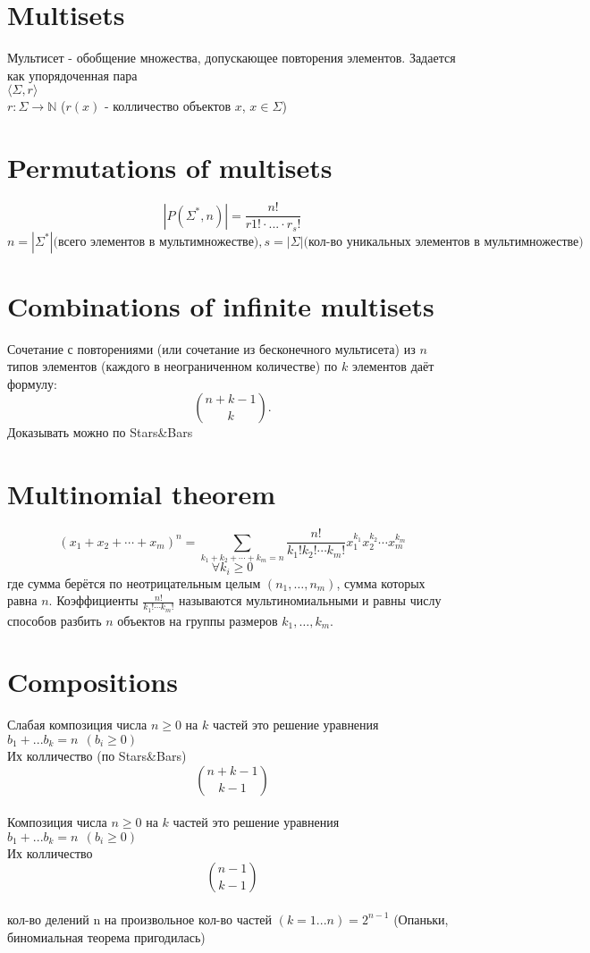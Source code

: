 \documentclass{article}
\begin{document}
	\section{Multisets}
	Мультисет - обобщение множества, допускающее повторения элементов. Задается как упорядоченная пара\\ 
	$\langle \Sigma, r \rangle$\\
	$r \colon \Sigma \rightarrow \mathbb{N}$
	($r(x)$ - колличество объектов $x$, $x \in \Sigma$)
	
	\section{Permutations of multisets}
	\[|P(\Sigma^*, n)| = \frac{n!}{r1! \cdot ... \cdot r_s!}\]
	\[n = |\Sigma^*| \text{(всего элементов в мультимножестве)}, s = |\Sigma| \text{(кол-во уникальных элементов в мультимножестве)}\]
	
	
	\section{Combinations of infinite multisets}
	Сочетание с повторениями (или сочетание из бесконечного мультисета) из $n$ типов элементов (каждого в неограниченном количестве) по $k$ элементов даёт формулу:
	\[
	\binom{n+k-1}{k}.
	\]
	Доказывать можно по Stars\&Bars
	
	\section{Multinomial theorem}
	\[
	(x_1 + x_2 + \cdots + x_m)^n = \sum_{k_1+k_2+\cdots+k_m=n} \frac{n!}{k_1!k_2!\cdots k_m!} x_1^{k_1}x_2^{k_2}\cdots x_m^{k_m}\]
	\[
	\forall k_i \geq 0
	\]
	где сумма берётся по неотрицательным целым $(n_1,\dots,n_m)$, сумма которых равна $n$. Коэффициенты $\frac{n!}{k_1!\cdots k_m!}$ называются мультиномиальными и равны числу способов разбить $n$ объектов на группы размеров $k_1,\dots,k_m$.
	
	\section{Compositions}
	Слабая композиция числа $n \geq 0$ на $k$ частей это решение уравнения $b_1 + ... b_k = n \ \ (b_i \geq 0)$\\
	Их колличество (по Stars\&Bars)
	\[\binom{n+k-1}{k-1}\]
	\\
	Композиция числа $n \geq 0$ на $k$ частей это решение уравнения $b_1 + ... b_k = n \ \ (b_i \ge 0)$\\
	Их колличество
	\[\binom{n-1}{k-1}\]
	\\
	кол-во делений n на произвольное кол-во частей \((k = 1...n) = 2^{n-1}\) (Опаньки, биномиальная теорема пригодилась)
	
\end{document}
